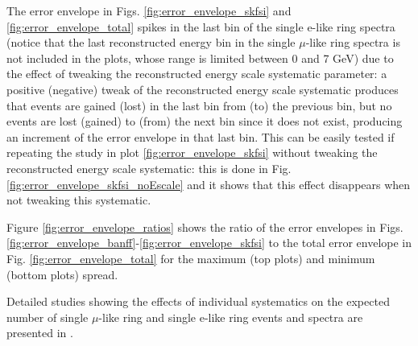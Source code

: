 The error envelope in Figs. \ref{fig:error_envelope_skfsi} and \ref{fig:error_envelope_total} spikes in the last bin
of the single e-like ring spectra (notice that the last reconstructed energy bin in the single $\mu$-like ring spectra is
not included in the plots, whose range is limited between 0 and 7 GeV) 
due to the effect of tweaking the reconstructed energy scale systematic parameter: 
a positive (negative) tweak of the reconstructed energy scale systematic produces that events are gained (lost) in the last bin
from (to) the previous bin, but no events are lost (gained) to (from) the next bin since it does not exist, producing an increment of the error envelope in that last bin. This can be easily tested if repeating the study in plot \ref{fig:error_envelope_skfsi} 
without tweaking the reconstructed energy scale systematic: this is done in Fig. \ref{fig:error_envelope_skfsi_noEscale} 
and it shows that this effect disappears when not tweaking this systematic. 

Figure \ref{fig:error_envelope_ratios} shows the ratio of the error envelopes in Figs. \ref{fig:error_envelope_banff}-\ref{fig:error_envelope_skfsi} to the total error envelope in Fig. \ref{fig:error_envelope_total}
for the maximum (top plots) and minimum (bottom plots) spread. 

Detailed studies showing the effects of individual systematics on the expected number of
single $\mu$-like ring and single e-like ring events and spectra are presented in \cite{AdditionalMaterial}.



